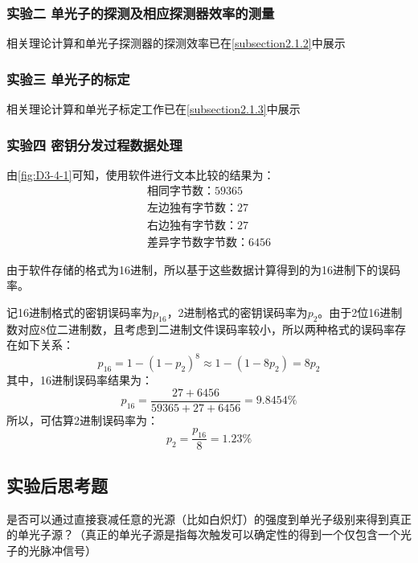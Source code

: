 \documentclass[dvipsnames, svgnames,a4paper,11pt]{article}
\begin{document}
	\subsubsection{实验二 \quad 单光子的探测及相应探测器效率的测量}

		相关理论计算和单光子探测器的探测效率已在\cref{subsection2.1.2}中展示


	\subsubsection{实验三 \quad 单光子的标定}

		相关理论计算和单光子标定工作已在\cref{subsection2.1.3}中展示



	\subsubsection{实验四 \quad 密钥分发过程数据处理}


		由\cref{fig:D3-4-1}可知，使用软件进行文本比较的结果为：
			\begin{align}
				\text{相同字节数：} 59365	\nonumber\\
				\text{左边独有字节数：} 27	\nonumber\\
				\text{右边独有字节数：} 27	\nonumber\\
				\text{差异字节数字节数：} 6456	\nonumber
			\end{align}
			
		由于软件存储的格式为16进制，所以基于这些数据计算得到的为16进制下的误码率。

		记16进制格式的密钥误码率为$p_{16}$，2进制格式的密钥误码率为$p_{2}$。由于2位16进制数对应8位二进制数，且考虑到二进制文件误码率较小，所以两种格式的误码率存在如下关系：
		\[
			p_{16} = 1 - (1 - p_{2})^8 \approx 1 - (1 - 8p_{2}) = 8p_{2}
		\]
		其中，16进制误码率结果为：
		\[
			p_{16} = \frac{27 + 6456}{59365 + 27 + 6456} = 9.8454 \%
		\]
		所以，可估算2进制误码率为：
		\[
			p_{2} = \frac{p_{16}}{8} = 1.23 \%
		\]



	
\subsection{实验后思考题}

\begin{question}
	是否可以通过直接衰减任意的光源（比如白炽灯）的强度到单光子级别来得到真正的单光子源？（真正的单光子源是指每次触发可以确定性的得到一个仅包含一个光子的光脉冲信号）
\end{question}
\end{document}
